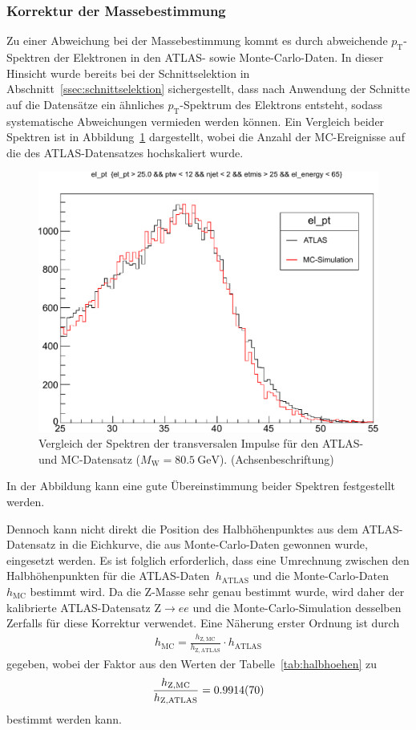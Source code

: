 \documentclass[11pt, a4paper]{article}
\numberwithin{equation}{section}
\newcommand{\korr}[1]{{\color{red}(#1)}}
\begin{document}
\subsubsection{Korrektur der Massebestimmung}
\label{sssec:korrektur}
Zu einer Abweichung bei der Massebestimmung kommt es durch abweichende $p_\mathrm{T}$-Spektren der Elektronen in den ATLAS- sowie Monte-Carlo-Daten.
In dieser Hinsicht wurde bereits bei der Schnittselektion in Abschnitt~\ref{ssec:schnittselektion} sichergestellt, dass nach Anwendung der Schnitte auf die Datensätze ein ähnliches $p_\mathrm{T}$-Spektrum des Elektrons entsteht, sodass systematische Abweichungen vermieden werden können.
Ein Vergleich beider Spektren ist in Abbildung~\ref{fig:vgl_spektren} dargestellt, wobei die Anzahl der MC-Ereignisse auf die des ATLAS-Datensatzes hochskaliert wurde.
\begin{figure}[h]
	\centering
	\includegraphics[width=.8\textwidth]{./figures/wmass/comparison.pdf}
	\caption{Vergleich der Spektren der transversalen Impulse für den ATLAS- und MC-Datensatz ($M_\mathrm{W} = \SI{80.5}{\GeV}$). \korr{Achsenbeschriftung}}
	\label{fig:vgl_spektren}
\end{figure}
In der Abbildung kann eine gute Übereinstimmung beider Spektren festgestellt werden.

Dennoch kann nicht direkt die Position des Halbhöhenpunktes aus dem ATLAS-Datensatz in die Eichkurve, die aus Monte-Carlo-Daten gewonnen wurde, eingesetzt werden.
Es ist folglich erforderlich, dass eine Umrechnung zwischen den Halbhöhenpunkten für die ATLAS-Daten~$h_\mathrm{ATLAS}$ und die Monte-Carlo-Daten~$h_\mathrm{MC}$ bestimmt wird.
Da die Z-Masse sehr genau bestimmt wurde, wird daher der kalibrierte ATLAS-Datensatz $\mathrm{Z} \rightarrow ee$ und die Monte-Carlo-Simulation desselben Zerfalls für diese Korrektur verwendet.
Eine Näherung erster Ordnung ist durch
\begin{align*}
	h_\mathrm{MC} = \frac{h_{\mathrm{Z, MC}}}{h_{\mathrm{Z, ATLAS}}} \cdot h_\mathrm{ATLAS}
\end{align*}
gegeben, wobei der Faktor aus den Werten der Tabelle~\ref{tab:halbhoehen} zu
\begin{align*}
	\frac{h_{\mathrm{Z, MC}}}{h_{\mathrm{Z, ATLAS}}} = \num{0.9914 +- 0.0070}
\end{align*}
bestimmt werden kann.
\end{document}
